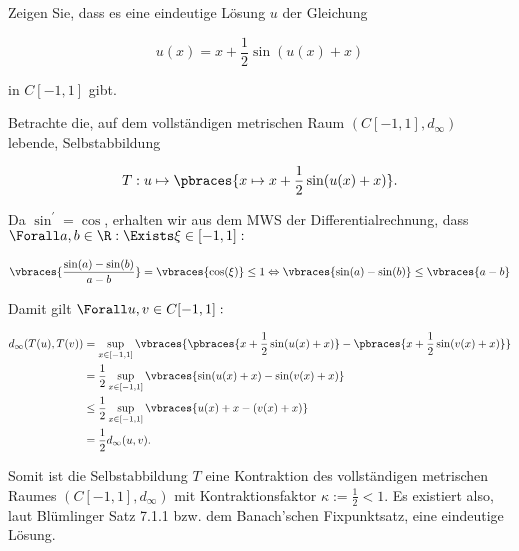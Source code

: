 \begin{exercise}

Zeigen Sie, dass es eine eindeutige Lösung $u$ der Gleichung

\begin{equation*}
  u(x) = x + \frac{1}{2}\sin(u(x)+x)
\end{equation*}

in $C[-1,1]$ gibt.

\end{exercise}

\begin{solution}

Betrachte die, auf dem vollständigen metrischen Raum $(C[-1, 1], d_\infty)$ lebende, Selbstabbildung

\begin{equation*}
  T: u \mapsto \pbraces{x \mapsto x + \frac{1}{2}\sin(u(x)+x)}.
\end{equation*}

Da $\sin^\prime = \cos$, erhalten wir aus dem MWS der Differentialrechnung, dass $\Forall a, b \in \R: \Exists \xi \in [-1,1]:$

\begin{align*}
  \vbraces{\frac{\sin(a)-\sin(b)}{a-b}} = \vbraces{\cos(\xi)} \leq 1 \Leftrightarrow
  \vbraces{\sin(a)-\sin(b)} \leq \vbraces{a-b}
\end{align*}

Damit gilt $\Forall u, v \in C[-1, 1]:$

\begin{align*}
  d_\infty(T(u),T(v))
  & = \sup_{x \in [-1, 1]} \vbraces
  {
    \pbraces{x + \frac{1}{2} \sin(u(x) + x)} -
    \pbraces{x + \frac{1}{2} \sin(v(x) + x)}
  } \\
  & = \frac{1}{2} \sup_{x \in [-1, 1]} \vbraces
  {
    \sin(u(x) + x) -
    \sin(v(x) + x)
  } \\
  & \leq \frac{1}{2}
         \sup_{x \in [-1, 1]}
         \vbraces{u(x) + x - (v(x) + x)} \\
  & = \frac{1}{2}
      d_\infty(u, v).
\end{align*}

Somit ist die Selbstabbildung $T$ eine Kontraktion des vollständigen metrischen Raumes $(C[-1, 1], d_\infty)$ mit Kontraktionsfaktor $ \kappa := \frac{1}{2} < 1$. Es existiert also, laut Blümlinger Satz 7.1.1 bzw. dem Banach'schen Fixpunktsatz, eine eindeutige Lösung.

\end{solution}
